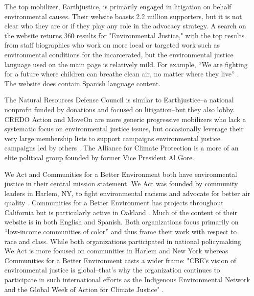 \documentclass[
      12pt,
        ]{article}
\begin{document}
The top mobilizer, Earthjustice, is primarily engaged in litigation on
behalf environmental causes. Their website boasts 2.2 million
supporters, but it is not clear who they are or if they play any role in
the advocacy strategy. A search on the website returns 360 results for
"Environmental Justice," with the top results from staff biographies
who work on more local or targeted work such as environmental conditions
for the incarcerated, but the environmental justice language used on the
main page is relatively mild. For example, ``We are fighting for a future
where children can breathe clean air, no matter where they live''
\citep{Earthjustice2017}. The website does contain Spanish language content.

The Natural Resources Defense Council is similar to Earthjustice--a
national nonprofit funded by donations and focused on litigation--but
they also lobby. CREDO Action and MoveOn are more generic progressive
mobilizers who lack a systematic focus on environmental justice issues,
but occasionally leverage their very large membership lists to support
campaigns environmental justice campaigns led by others
\citep{MoveOn.org2017, CREDO2017}. The Alliance for Climate Protection is a
more of an elite political group founded by former Vice President Al
Gore.

We Act and Communities for a Better Environment both have environmental
justice in their central mission statement. We Act was founded by
community leaders in Harlem, NY, to fight environmental racisms and
advocate for better air quality \citep{WEACT2017}. Communities for a Better
Environment has projects throughout California but is particularly
active in Oakland \citep{CBECAL2017CommunitiesEnvironment}. Much of the
content of their website is in both English and Spanish. Both
organizations focus primarily on ``low-income communities of color'' and
thus frame their work with respect to race and class. While both
organizations participated in national policymaking We Act is more
focused on communities in Harlem and New York whereas Communities for a
Better Environment casts a wider frame: "CBE's vision of environmental
justice is global--that's why the organization continues to participate
in such international efforts as the Indigenous Environmental Network
and the Global Week of Action for Climate Justice" \citep{CBECAL2017}.
\end{document}
